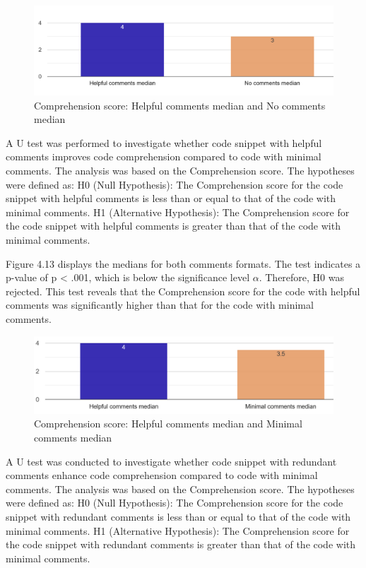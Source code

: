\begin{figure} [H]
  \centering
  \includegraphics[scale=0.6]{figures/h-0-q3.png}
  \caption{Comprehension score:  Helpful comments median and No comments median}
  \label{fig:AnhangsChor}
\end{figure}




A U test was performed to investigate whether code snippet with helpful comments improves code comprehension compared to code with minimal comments. The analysis was based on the Comprehension score. The hypotheses were defined as: H0 (Null Hypothesis): The Comprehension score for the code snippet with helpful comments is less than or equal to that of the code with minimal comments.  H1 (Alternative Hypothesis): The Comprehension score for the code snippet with helpful comments is greater than that of the code with minimal comments.

Figure 4.13 displays the medians for both comments formats.
The test indicates a p-value of p < .001, which is below the significance level $\alpha$. Therefore, H0 was rejected.  This test reveals that the Comprehension score for the code with helpful comments was significantly higher than that for the code with minimal comments. 

\begin{figure} [H]
  \centering
  \includegraphics[scale=0.43]{figures/h-m-q3.png}
  \caption{Comprehension score:  Helpful comments median and Minimal comments median}
  \label{fig:AnhangsChor}
\end{figure}


A U test was conducted to investigate whether code snippet with redundant comments enhance code comprehension compared to code with minimal comments. The analysis was based on the Comprehension score. The hypotheses were defined as: H0 (Null Hypothesis): The Comprehension score for the code snippet with redundant comments is less than or equal to that of the code with minimal comments.  H1 (Alternative Hypothesis): The Comprehension score for the code snippet with redundant comments is greater than that of the code with minimal comments. 


